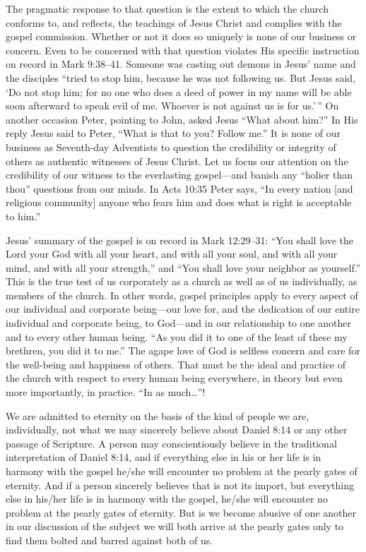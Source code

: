 The pragmatic response to that question is the extent to which the church
conforms to, and reflects, the teachings of Jesus Christ and complies with
the gospel commission. Whether or not it does so uniquely is none of our
business or concern. Even to be concerned with that question violates His
specific instruction on record in Mark 9:38--41. Someone was casting out
demons in Jesus' name and the disciples ``tried to stop him, because he was
not following us. But Jesus said, `Do not stop him; for no one who does a
deed of power in my name will be able soon afterward to speak evil of me.
Whoever is not against us is for us.'\,'' On another occasion Peter, pointing
to John, asked Jesus ``What about him?'' In His reply Jesus said to Peter,
``What is that to you? Follow me.'' It is none of our business as Seventh-day
Adventists to question the credibility or integrity of others as authentic
witnesses of Jesus Christ. Let us focus our attention on the credibility of
our witness to the everlasting gospel---and banish any ``holier than thou''
questions from our minds. In Acts 10:35 Peter says, ``In every nation [and
religious community] anyone who fears him and does what is right is
acceptable to him.''

Jesus' summary of the gospel is on record in Mark 12:29--31: ``You shall love
the Lord your God with all your heart, and with all your soul, and with all
your mind, and with all your strength,'' and ``You shall love your neighbor as
yourself.'' This is the true test of us corporately as a church as well as of
us individually, as members of the church. In other words, gospel principles
apply to every aspect of our individual and corporate being---our love for,
and the dedication of our entire individual and corporate being, to 
God---and in our relationship to one another and to every other human being.
``As you did it to one of the least of these my brethren, you did it to
me.'' The agape love of God is selfless concern and care for the
well-being and happiness of others. That must be the ideal and practice of
the church with respect to every human being everywhere, in theory but even
more importantly, in practice. ``In as much\ldots''!

We are admitted to eternity on the basis of the kind of people we are,
individually, not what we may sincerely believe about Daniel 8:14 or any
other passage of Scripture. A person may conscientiously believe in the
traditional interpretation of Daniel 8:14, and if everything else in his or
her life is in harmony with the gospel he/she will encounter no problem at
the pearly gates of eternity. And if a person sincerely believes that is not
its import, but everything else in his/her life is in harmony with the
gospel, he/she will encounter no problem at the pearly gates of eternity.
But is we become abusive of one another in our discussion of the subject we
will both arrive at the pearly gates only to find them bolted and barred
against both of us.


